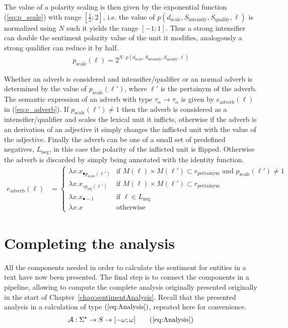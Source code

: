 The value of a polarity scaling is then given by the exponential function (\ref{eq:p_scale}) with range $\left[\frac{1}{2}; 2 \right]$, i.e. the value of $p(d_\mathrm{scale}, S_\mathrm{intensify}, S_\mathrm{qualify}, \ell)$ is normalized using $N$ such it yields the range $[-1; 1]$. Thus a strong intensifier can double the sentiment polarity value of the unit it modifies, analogously a strong qualifier can reduce it by half.  
\begin{align}
    p_\mathrm{scale}(\ell) = 2^{N \cdot p(d_\mathrm{scale}, S_\mathrm{intensify}, S_\mathrm{qualify}, \ell)}
    \label{eq:p_scale}
\end{align}

Whether an adverb is considered and intensifier/qualifier or an normal adverb is determined by the value of $p_\mathrm{scale}(\ell')$, where $\ell'$ is the pertainym of the adverb. The semantic expression of an adverb with type $\tau_\alpha \to \tau_\alpha$ is given by $e_\mathrm{adverb}(\ell)$ in (\ref{eq:e_adverb}). If $p_\mathrm{scale}(\ell') \neq 1$ then the adverb is considered as a intensifier/qualifier and scales the lexical unit it inflicts, otherwise if the adverb is an derivation of an adjective it simply changes the inflicted unit with the value of the adjective. Finally the adverb can be one of a small set of predefined negatives, $L_\mathrm{neg}$, in this case the polarity of the inflicted unit is flipped. Otherwise the adverb is discarded by simply being annotated with the identity function.
\begin{align}
	e_\mathrm{adverb}(\ell) &=
	\begin{cases}    
    \lambda x . x_{\bullet p_\mathrm{scale}(\ell')} & \text{if $M(\ell) \times M(\ell') \subset r_\mathrm{pertainym}$ and $p_\mathrm{scale}(\ell') \neq 1$} \\
    \lambda x . x_{\circ p_\mathrm{adj}(\ell')} & \text{if $M(\ell) \times M(\ell') \subset r_\mathrm{pertainym}$} \\
    \lambda x . x_{\bullet -1} & \text{if $\ell \in L_\mathrm{neg}$}\\
    \lambda x . x & \text{otherwise}
	\end{cases}
	\label{eq:e_adverb}
\end{align}

\section{Completing the analysis}
All the components needed in order to calculate the sentiment for entities in a text have now been presented. The final step is to connect the components in a pipeline, allowing to compute the complete analysis originally presented originally in the start of Chapter~\ref{chap:sentimentAnalysis}. Recall that the presented analysis in a calculation of type $(\ref{eq:Analysis})$, repeated here for convenience.
  \begin{align}
	 \mathcal{A}: \Sigma^\star \to S \to [-\omega;\omega] \tag{\ref{eq:Analysis}}	 
  \end{align}

